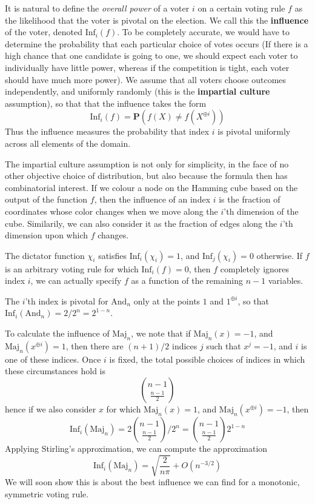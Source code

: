 It is natural to define the {\it overall power} of a voter $i$ on a certain voting rule $f$ as the likelihood that the voter is pivotal on the election. We call this the {\bf influence} of the voter, denoted $\text{Inf}_i(f)$. To be completely accurate, we would have to determine the probability that each particular choice of votes occurs (If there is a high chance that one candidate is going to one, we should expect each voter to individually have little power, whereas if the competition is tight, each voter should have much more power). We assume that all voters choose outcomes independently, and uniformly randomly (this is the {\bf impartial culture} assumption), so that that the influence takes the form
%
\[ \text{Inf}_i(f) = \mathbf{P}(f(X) \neq f(X^{\oplus i})) \]
%
Thus the influence measures the probability that index $i$ is pivotal uniformly across all elements of the domain.

The impartial culture assumption is not only for simplicity, in the face of no other objective choice of distribution, but also because the formula then has combinatorial interest. If we colour a node on the Hamming cube based on the output of the function $f$, then the influence of an index $i$ is the fraction of coordinates whose color changes when we move along the $i$'th dimension of the cube. Similarily, we can also consider it as the fraction of edges along the $i$'th dimension upon which $f$ changes.

\begin{example}
    The dictator function $\chi_i$ satisfies $\text{Inf}_i(\chi_i) = 1$, and $\text{Inf}_j(\chi_i) = 0$ otherwise. If $f$ is an arbitrary voting rule for which $\text{Inf}_i(f) = 0$, then $f$ completely ignores index $i$, we can actually specify $f$ as a function of the remaining $n-1$ variables.
\end{example}

\begin{example}
    The $i$'th index is pivotal for $\text{And}_n$ only at the points $1$ and $1^{\oplus i}$, so that $\text{Inf}_i(\text{And}_n) = 2/2^n = 2^{1-n}$.
\end{example}

\begin{example}
    To calculate the influence of $\text{Maj}_n$, we note that if $\text{Maj}_n(x) = -1$, and $\text{Maj}_n(x^{\oplus i}) = 1$, then there are $(n+1)/2$ indices $j$ such that $x^j = -1$, and $i$ is one of these indices. Once $i$ is fixed, the total possible choices of indices in which these circumstances hold is
    \[ {n - 1 \choose \frac{n-1}{2}} \]
    hence if we also consider $x$ for which $\text{Maj}_n(x) = 1$, and $\text{Maj}_n(x^{\oplus i}) = -1$, then
    \[ \text{Inf}_i(\text{Maj}_n) = 2 {n-1 \choose \frac{n-1}{2}} / 2^n = {n-1 \choose \frac{n-1}{2}} 2^{1-n} \]
    Applying Stirling's approximation, we can compute the approximation
    \[ \text{Inf}_i(\text{Maj}_n) = \sqrt{\frac{2}{n\pi}} + O(n^{-3/2}) \]
    We will soon show this is about the best influence we can find for a monotonic, symmetric voting rule.
\end{example}

